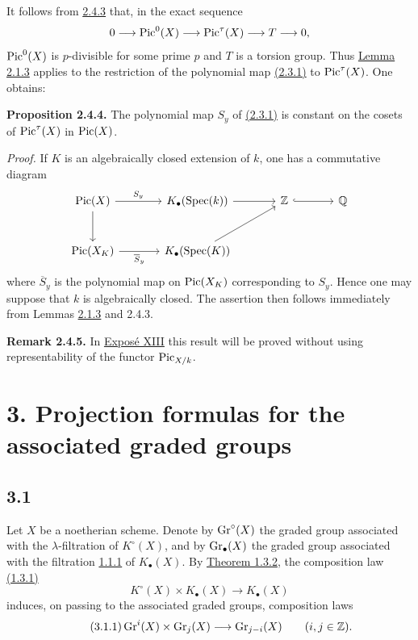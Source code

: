 It follows from \hyperlink{sga6.e10.lem.2-4-3}{2.4.3} that, in the exact sequence
\[
0\longrightarrow\operatorname{Pic}^0(X)\longrightarrow\operatorname{Pic}^\tau(X)
\longrightarrow T\longrightarrow0,
\]
$\operatorname{Pic}^0(X)$ is $p$-divisible for some prime $p$ and $T$ is a torsion group.
Thus \hyperlink{sga6.e10.lem.2-1-3}{Lemma 2.1.3} applies to the restriction of the polynomial map \hyperlink{sga6.e10.prop.2-3-1}{(2.3.1)} to
$\operatorname{Pic}^\tau(X)$. One obtains:

\textbf{Proposition 2.4.4.}
The polynomial map $S_y$ of \hyperlink{sga6.e10.prop.2-3-1}{(2.3.1)} is constant on the cosets of
$\operatorname{Pic}^\tau(X)$ in $\operatorname{Pic}(X)$.

\emph{Proof.}
If $K$ is an algebraically closed extension of $k$, one has a commutative
diagram
\[
\begin{tikzcd}[column sep=large,row sep=large]
\Pic(X) \arrow[r,"S_y"] \arrow[d] &
K_\bullet(\Spec(k)) \arrow[r] &
\mathbb Z \arrow[r,hook] & \mathbb Q\\
\Pic(X_K) \arrow[r,"\overline S_y"'] &
K_\bullet(\Spec(K)) \arrow[ur] &&
\end{tikzcd}
\]
where $\overline S_y$ is the polynomial map on $\operatorname{Pic}(X_K)$ corresponding to
$S_y$. Hence one may suppose that $k$ is algebraically closed. The
assertion then follows immediately from Lemmas \hyperlink{sga6.e10.lem.2-1-3}{2.1.3} and 2.4.3.

\textbf{Remark 2.4.5.}
In \hyperlink{sga6.e13.expose}{Expos\'e XIII} this result will be proved without using representability of
the functor $\operatorname{Pic}_{X/k}$.

\section*{3. Projection formulas for the associated graded groups}

\subsection*{3.1}
Let $X$ be a noetherian scheme. Denote by $\operatorname{Gr}^{\circ}(X)$ the graded group associated
with the \mbox{$\lambda$-filtration} of $K^\circ(X)$, and by $\operatorname{Gr}_{\bullet}(X)$ the graded
group associated with the filtration \hyperlink{sga6.e10.def.1-1-1}{1.1.1} of $K_\bullet(X)$. By \hyperlink{sga6.e10.thm.1-3-2}{Theorem
1.3.2}, the composition law \hyperlink{sga6.e10.eq.1-3-1}{(1.3.1)}
\[
K^\circ(X)\times K_\bullet(X)\longrightarrow K_\bullet(X)
\]
induces, on passing to the associated graded groups, composition laws
\begin{equation}\tag{3.1.1}
\operatorname{Gr}^i(X)\times\operatorname{Gr}_j(X)\longrightarrow\operatorname{Gr}_{j-i}(X)
\qquad(i,j\in\mathbb Z).
\end{equation}

